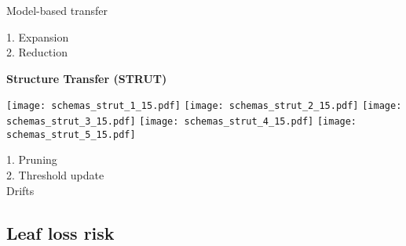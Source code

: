 \begin{frame}{Model-based transfer}
\begin{minipage}[t]{0.49\linewidth}
    \pause \pause
    \textcolor{myblue}{1. Expansion}\\
    \pause
    \textcolor{myorange}{2. Reduction}\\
    \bigskip

\end{minipage}\hfill
\begin{minipage}[t]{0.49\linewidth}
    \vspace{0pt}
    \centering
    \pause \pause
    \textbf{Structure Transfer (STRUT)}
    
    \renewcommand{\ratio}{0.55}
    \begin{overprint}
        \centering\texttt{[image: schemas\_strut\_1\_15.pdf]}
        \centering\texttt{[image: schemas\_strut\_2\_15.pdf]}
        \centering\texttt{[image: schemas\_strut\_3\_15.pdf]}
        \centering\texttt{[image: schemas\_strut\_4\_15.pdf]}
        \centering\texttt{[image: schemas\_strut\_5\_15.pdf]}
    \end{overprint}
    \textcolor{myorange}{1. Pruning}\\
    \textcolor{myblue}{2. Threshold update}\\
    \bigskip
    Drifts
\end{minipage}

\end{frame}

\subsection{Leaf loss risk}

